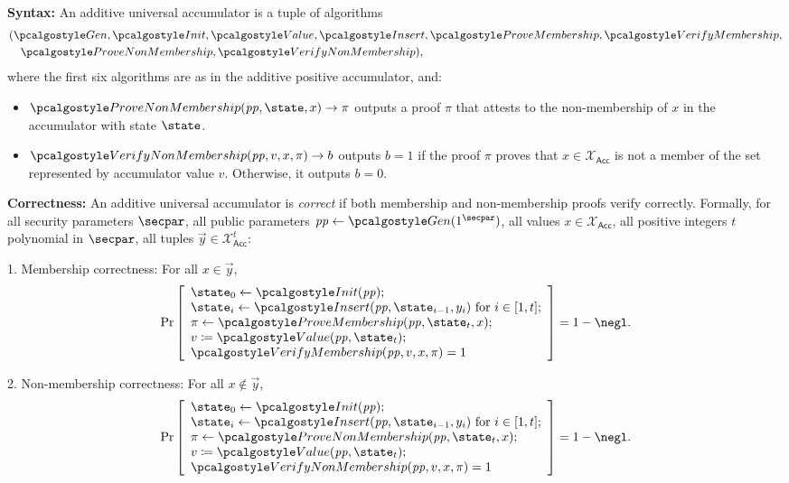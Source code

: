 \ifsolutions
\begin{mysolution}
  \textbf{Syntax:} An additive universal accumulator is a tuple of \ppt algorithms 
  \begin{align*}
    &(\algo{Gen}, \algo{Init}, \algo{Value}, \algo{Insert}, \algo{ProveMembership}, \algo{VerifyMembership},\\
    &\quad \algo{ProveNonMembership}, \algo{VerifyNonMembership}),
  \end{align*}
  where the first six algorithms are as in the additive positive accumulator, and:
  \begin{itemize}
    \item $\algo{ProveNonMembership}(\params, \state, x) \rightarrow \pi$ outputs a proof $\pi$ that attests to the non-membership of $x$ in the accumulator with state $\state$.
    \item $\algo{VerifyNonMembership}(\params, v, x, \pi) \rightarrow b$ outputs $b = 1$ if the proof $\pi$ proves that $x \in \mathcal{X}_\mathsf{Acc}$ is not a member of the set represented by accumulator value $v$.
    Otherwise, it outputs $b = 0$.
  \end{itemize}
  
  \textbf{Correctness:} An additive universal accumulator is \emph{correct} if both membership and non-membership proofs verify correctly.
  Formally, for all security parameters $\secpar$, all public parameters $\params \gets \algo{Gen}(1^\secpar)$, all values $x \in \mathcal{X}_\mathsf{Acc}$, all positive integers $t$ polynomial in $\secpar$, all tuples $\vec{y} \in \mathcal{X}_\mathsf{Acc}^{t}$:
  
  1. Membership correctness: For all $x \in \vec{y}$,
  \[
    \Pr\left[
    \begin{array}{l}
      \state_0 \gets \algo{Init}(\params); \\
      \state_i \gets \algo{Insert}(\params, \state_{i-1}, y_i) \text{ for } i \in [1, t]; \\
      \pi \gets \algo{ProveMembership}(\params, \state_t, x); \\
      v \defeq \algo{Value}(\params, \state_t); \\
      \algo{VerifyMembership}(\params, v, x, \pi) = 1
    \end{array}
    \right] = 1 - \negl.
  \]
  
  2. Non-membership correctness: For all $x \notin \vec{y}$,
  \[
    \Pr\left[
    \begin{array}{l}
      \state_0 \gets \algo{Init}(\params); \\
      \state_i \gets \algo{Insert}(\params, \state_{i-1}, y_i) \text{ for } i \in [1, t]; \\
      \pi \gets \algo{ProveNonMembership}(\params, \state_t, x); \\
      v \defeq \algo{Value}(\params, \state_t); \\
      \algo{VerifyNonMembership}(\params, v, x, \pi) = 1
    \end{array}
    \right] = 1 - \negl.
  \]
  

\end{mysolution}
